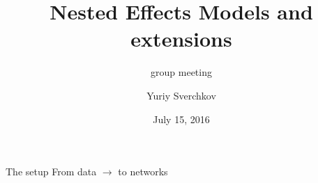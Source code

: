 \documentclass{beamer}
\title{Nested Effects Models and extensions}
\subtitle{group meeting}
\date{July 15, 2016}
\author{Yuriy Sverchkov}
\institute{University of Wisconsin--Madison}
\begin{document}
\begin{frame}[plain]
  \titlepage
\end{frame}

\begin{frame}{The setup}
From data $\rightarrow$ to networks
\end{frame}
\end{document}
